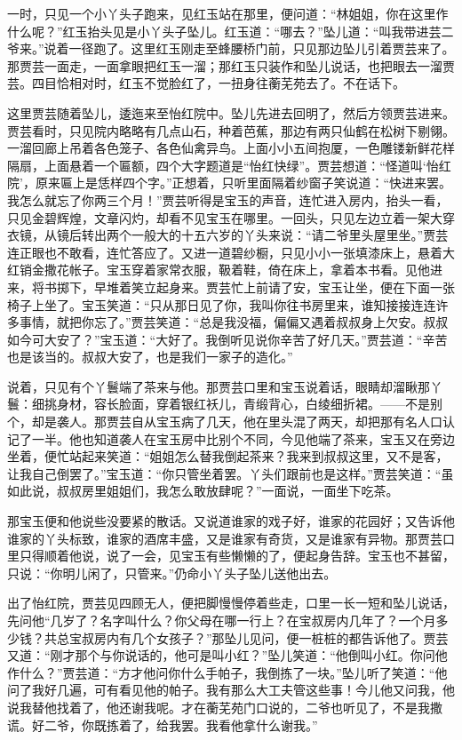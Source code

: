 \documentclass[12pt,oneside]{book}
\begin{document}
一时，只见一个小丫头子跑来，见红玉站在那里，便问道：“林姐姐，你在这里作什么呢？”红玉抬头见是小丫头子坠儿。红玉道：“哪去？”坠儿道：“叫我带进芸二爷来。”说着一径跑了。这里红玉刚走至蜂腰桥门前，只见那边坠儿引着贾芸来了。那贾芸一面走，一面拿眼把红玉一溜；那红玉只装作和坠儿说话，也把眼去一溜贾芸。四目恰相对时，红玉不觉脸红了，一扭身往蘅芜苑去了。不在话下。

这里贾芸随着坠儿，逶迤来至怡红院中。坠儿先进去回明了，然后方领贾芸进来。贾芸看时，只见院内略略有几点山石，种着芭蕉，那边有两只仙鹤在松树下剔翎。一溜回廊上吊着各色笼子、各色仙禽异鸟。上面小小五间抱厦，一色雕镂新鲜花样隔扇，上面悬着一个匾额，四个大字题道是“怡红快绿”。贾芸想道：“怪道叫‘怡红院’，原来匾上是恁样四个字。”正想着，只听里面隔着纱窗子笑说道：“快进来罢。我怎么就忘了你两三个月！”贾芸听得是宝玉的声音，连忙进入房内，抬头一看，只见金碧辉煌，文章闪灼，却看不见宝玉在哪里。一回头，只见左边立着一架大穿衣镜，从镜后转出两个一般大的十五六岁的丫头来说：“请二爷里头屋里坐。”贾芸连正眼也不敢看，连忙答应了。又进一道碧纱橱，只见小小一张填漆床上，悬着大红销金撒花帐子。宝玉穿着家常衣服，靸着鞋，倚在床上，拿着本书看。见他进来，将书掷下，早堆着笑立起身来。贾芸忙上前请了安，宝玉让坐，便在下面一张椅子上坐了。宝玉笑道：“只从那日见了你，我叫你往书房里来，谁知接接连连许多事情，就把你忘了。”贾芸笑道：“总是我没福，偏偏又遇着叔叔身上欠安。叔叔如今可大安了？”宝玉道：“大好了。我倒听见说你辛苦了好几天。”贾芸道：“辛苦也是该当的。叔叔大安了，也是我们一家子的造化。”

说着，只见有个丫鬟端了茶来与他。那贾芸口里和宝玉说着话，眼睛却溜瞅那丫鬟：细挑身材，容长脸面，穿着银红袄儿，青缎背心，白绫细折裙。——不是别个，却是袭人。那贾芸自从宝玉病了几天，他在里头混了两天，却把那有名人口认记了一半。他也知道袭人在宝玉房中比别个不同，今见他端了茶来，宝玉又在旁边坐着，便忙站起来笑道：“姐姐怎么替我倒起茶来？我来到叔叔这里，又不是客，让我自己倒罢了。”宝玉道：“你只管坐着罢。丫头们跟前也是这样。”贾芸笑道：“虽如此说，叔叔房里姐姐们，我怎么敢放肆呢？”一面说，一面坐下吃茶。

那宝玉便和他说些没要紧的散话。又说道谁家的戏子好，谁家的花园好；又告诉他谁家的丫头标致，谁家的酒席丰盛，又是谁家有奇货，又是谁家有异物。那贾芸口里只得顺着他说，说了一会，见宝玉有些懒懒的了，便起身告辞。宝玉也不甚留，只说：“你明儿闲了，只管来。”仍命小丫头子坠儿送他出去。

出了怡红院，贾芸见四顾无人，便把脚慢慢停着些走，口里一长一短和坠儿说话，先问他“几岁了？名字叫什么？你父母在哪一行上？在宝叔房内几年了？一个月多少钱？共总宝叔房内有几个女孩子？”那坠儿见问，便一桩桩的都告诉他了。贾芸又道：“刚才那个与你说话的，他可是叫小红？”坠儿笑道：“他倒叫小红。你问他作什么？”贾芸道：“方才他问你什么手帕子，我倒拣了一块。”坠儿听了笑道：“他问了我好几遍，可有看见他的帕子。我有那么大工夫管这些事！今儿他又问我，他说我替他找着了，他还谢我呢。才在蘅芜苑门口说的，二爷也听见了，不是我撒谎。好二爷，你既拣着了，给我罢。我看他拿什么谢我。”
\end{document}
